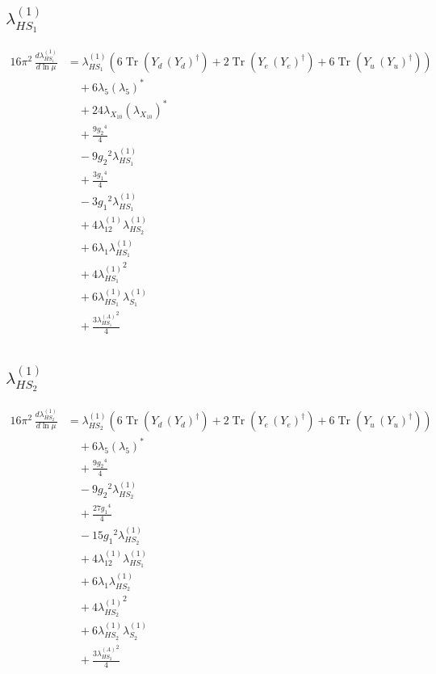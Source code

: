 \documentclass[10pt,a4paper]{article}
\begin{document}
\subsection*{$\lambda_{HS_1}^{(1)}$}
\begin{align*}
16\pi^2\,\frac{d \lambda_{HS_1}^{(1)}}{d\ln\mu} &={\lambda_{HS_1}^{(1)}} (6 \operatorname{Tr}\!\left({Y_d}\,\left({Y_d}\right)^{\dagger}\right)+2 \operatorname{Tr}\!\left({Y_e}\,\left({Y_e}\right)^{\dagger}\right)+6 \operatorname{Tr}\!\left({Y_u}\,\left({Y_u}\right)^{\dagger}\right)) \\
&\quad +6 {\lambda_5} \left({\lambda_5}\right)^{*} \\
&\quad +24 {\lambda_{X_{10}}} \left({\lambda_{X_{10}}}\right)^{*} \\
&\quad +\frac{9 {g_2}^4}{4} \\
&\quad -9 {g_2}^2 {\lambda_{HS_1}^{(1)}} \\
&\quad +\frac{3 {g_1}^4}{4} \\
&\quad -3 {g_1}^2 {\lambda_{HS_1}^{(1)}} \\
&\quad +4 {\lambda_{12}^{(1)}} {\lambda_{HS_2}^{(1)}} \\
&\quad +6 {\lambda_1} {\lambda_{HS_1}^{(1)}} \\
&\quad +4 {\lambda_{HS_1}^{(1)}}^2 \\
&\quad +6 {\lambda_{HS_1}^{(1)}} {\lambda_{S_1}^{(1)}} \\
&\quad +\frac{3 {\lambda_{HS_1}^{(A)}}^2}{4} \\
\end{align*}
\subsection*{$\lambda_{HS_2}^{(1)}$}
\begin{align*}
16\pi^2\,\frac{d \lambda_{HS_2}^{(1)}}{d\ln\mu} &={\lambda_{HS_2}^{(1)}} (6 \operatorname{Tr}\!\left({Y_d}\,\left({Y_d}\right)^{\dagger}\right)+2 \operatorname{Tr}\!\left({Y_e}\,\left({Y_e}\right)^{\dagger}\right)+6 \operatorname{Tr}\!\left({Y_u}\,\left({Y_u}\right)^{\dagger}\right)) \\
&\quad +6 {\lambda_5} \left({\lambda_5}\right)^{*} \\
&\quad +\frac{9 {g_2}^4}{4} \\
&\quad -9 {g_2}^2 {\lambda_{HS_2}^{(1)}} \\
&\quad +\frac{27 {g_1}^4}{4} \\
&\quad -15 {g_1}^2 {\lambda_{HS_2}^{(1)}} \\
&\quad +4 {\lambda_{12}^{(1)}} {\lambda_{HS_1}^{(1)}} \\
&\quad +6 {\lambda_1} {\lambda_{HS_2}^{(1)}} \\
&\quad +4 {\lambda_{HS_2}^{(1)}}^2 \\
&\quad +6 {\lambda_{HS_2}^{(1)}} {\lambda_{S_2}^{(1)}} \\
&\quad +\frac{3 {\lambda_{HS_2}^{(A)}}^2}{4} \\
\end{align*}
\end{document}
